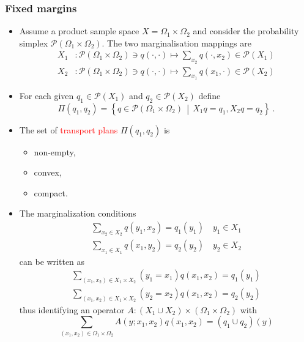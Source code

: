 \documentclass[xcolor=svgnames]{beamer}
\newcommand{\rosso}[1]{\textcolor{red}{#1}}
\newcommand{\setof}[2]{\left\{#1 \, \middle| \, #2 \right\}}
\newcommand{\simplexon}[1]{\mathcal P\left(#1\right)}
\renewcommand{\emph}{\rosso}
\begin{document}
\begin{frame}\small\frametitle{Fixed margins}
\begin{itemize}
    \item Assume a product sample space $X = \Omega_1 \times \Omega_2$ and consider the probability simplex $\simplexon{\Omega_1 \times \Omega_2}$. The two marginalisation mappings are
    \begin{align*}
 X_1& \colon \simplexon{\Omega_1 \times \Omega_2} \ni q(\cdot,\cdot) \mapsto \sum_{x_2} q(\cdot,x_2) \in  \simplexon{X_1}  \\
 X_2& \colon \simplexon{\Omega_1 \times \Omega_2} \ni q(\cdot,\cdot) \mapsto \sum_{x_1} q(x_1,\cdot) \in  \simplexon{X_2} 
    \end{align*}
    \item For each given $q_1 \in \simplexon{X_1}$ and $q_2 \in \simplexon{X_2}$ define 
    \begin{equation*}
        \Pi(q_1,q_2) = \setof{q \in \simplexon{\Omega_1 \times \Omega_2}} {X_1 q = q_1, X_2 q = q_2} \ .
    \end{equation*}
    \item The set of \emph{transport plans}  $\Pi(q_1,q_2)$ is \begin{itemize} \item non-empty, \item convex, \item compact.
    \end{itemize}

    \item The marginalization conditions
    \begin{gather*}
        \sum_{x_2 \in X_2} q(y_1,x_2) = q_1(y_1) \quad y_1 \in X_1 \\
            \sum_{x_1 \in X_1} q(x_1,y_2) = q_2(y_2) \quad y_2 \in X_2
    \end{gather*}
    can be written as
    \begin{gather*}
        \sum_{(x_1,x_2) \in X_1\times X_2} (y_1 = x_1) q(x_1,x_2) = q_1(y_1) \\
             \sum_{(x_1,x_2) \in X_1\times X_2} (y_2 = x_2) q(x_1,x_2) = q_2(y_2)
    \end{gather*}
    thus identifying an operator $A \colon (X_1 \cup X_2) \times (\Omega_1 \times \Omega_2)$ with
    \begin{equation*}
     \sum_{(x_1,x_2) \in \Omega_1 \times \Omega_2} A(y;x_1,x_2) q(x_1,x_2) = (q_1 \cup q_2)(y)    
    \end{equation*}
\end{itemize}    
\end{frame}
\end{document}
